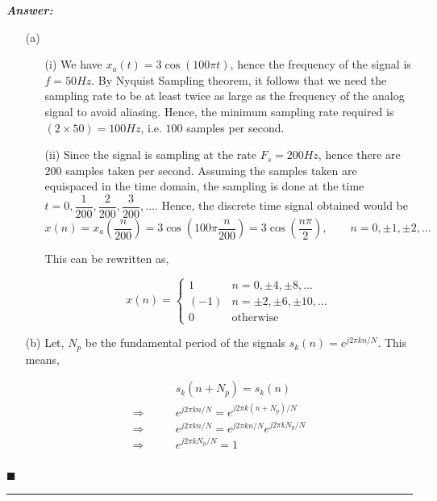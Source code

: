 \documentclass[12pt]{article}
\theoremstyle{definition}
\newenvironment{answer}{
    \textbf{\textit{Answer:}} \qquad
}{\hfill $\blacksquare$ \\ 

\begin{center}
    \rule{0.8\linewidth}{1.5px} 
    \vspace*{1cm}   
\end{center}
}
\begin{document}
\begin{answer}
    \begin{enumerate}
        \item[(a)] 
        \begin{enumerate}
            \item[(i)] We have $x_a(t) = 3\cos(100 \pi t)$, hence the frequency of the signal is $f = 50 Hz$. By Nyquist Sampling theorem, it follows that we need the sampling rate to be at least twice as large as the frequency of the analog signal to avoid aliasing. Hence, the minimum sampling rate required is $(2 \times 50) = 100 Hz$, i.e. $100$ samples per second.
            \item[(ii)] Since the signal is sampling at the rate $F_s = 200 Hz$, hence there are $200$ samples taken per second. Assuming the samples taken are equispaced in the time domain, the sampling is done at the time $t = 0, \dfrac{1}{200}, \dfrac{2}{200}, \dfrac{3}{200}, \dots$. Hence, the discrete time signal obtained would be 
            $$
            x(n) = x_a\left(\dfrac{n}{200}\right) = 3 \cos\left( 100 \pi \dfrac{n}{200} \right) = 3 \cos\left( \dfrac{n\pi}{2} \right), \qquad n = 0, \pm 1, \pm 2, \dots
            $$ 

            This can be rewritten as,

            $$
            x(n) = \begin{cases}
                1 & n = 0, \pm 4, \pm 8, \dots\\
                (-1) & n = \pm 2, \pm 6, \pm 10, \dots\\
                0 & \text{otherwise}
            \end{cases}
            $$

        \end{enumerate} 
        \item[(b)] Let, $N_p$ be the fundamental period of the signals $s_k(n) = e^{j2\pi kn / N}$. This means,
        
        \begin{align*}
            & s_k(n + N_p) = s_k(n)\\
            \Rightarrow \qquad & e^{j2\pi kn / N} = e^{j2\pi k(n + N_p) / N}\\
            \Rightarrow \qquad & e^{j2\pi kn / N} = e^{j2\pi kn / N} e^{j 2\pi k N_p / N}\\
            \Rightarrow \qquad & e^{j 2\pi k N_p / N} = 1\\
        \end{align*}


\end{enumerate}
\end{answer}
\end{document}
